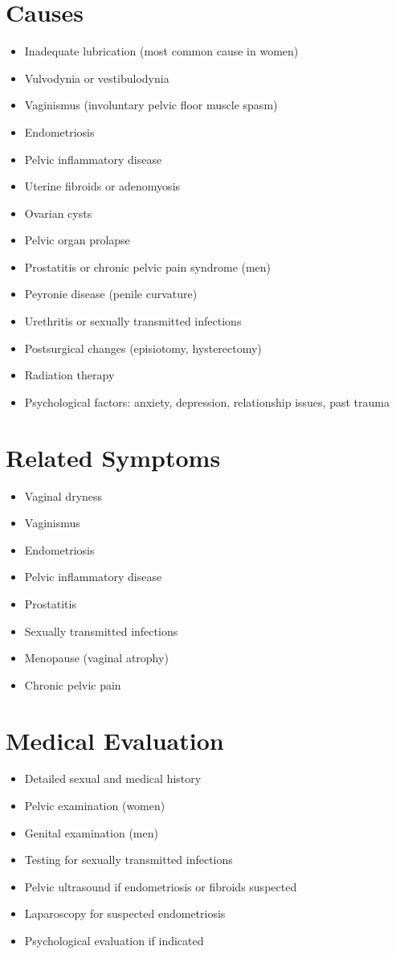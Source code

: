 \section*{Causes}
\begin{itemize}
\item Inadequate lubrication (most common cause in women)
\item Vulvodynia or vestibulodynia
\item Vaginismus (involuntary pelvic floor muscle spasm)
\item Endometriosis
\item Pelvic inflammatory disease
\item Uterine fibroids or adenomyosis
\item Ovarian cysts
\item Pelvic organ prolapse
\item Prostatitis or chronic pelvic pain syndrome (men)
\item Peyronie disease (penile curvature)
\item Urethritis or sexually transmitted infections
\item Postsurgical changes (episiotomy, hysterectomy)
\item Radiation therapy
\item Psychological factors: anxiety, depression, relationship issues, past trauma
\end{itemize}

\section*{Related Symptoms}
\begin{itemize}
\item Vaginal dryness
\item Vaginismus
\item Endometriosis
\item Pelvic inflammatory disease
\item Prostatitis
\item Sexually transmitted infections
\item Menopause (vaginal atrophy)
\item Chronic pelvic pain
\end{itemize}

\section*{Medical Evaluation}
\begin{itemize}
\item Detailed sexual and medical history
\item Pelvic examination (women)
\item Genital examination (men)
\item Testing for sexually transmitted infections
\item Pelvic ultrasound if endometriosis or fibroids suspected
\item Laparoscopy for suspected endometriosis
\item Psychological evaluation if indicated
\end{itemize}

